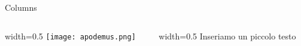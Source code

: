 \documentclass{beamer}
\begin{document}
\begin{frame}{Columns} 

    \begin{columns}
    \begin{column}{width=0.5\textwidth}
        \texttt{[image: apodemus.png]}       
    \end{column}
    \begin{column}{width=0.5\textwidth}
        Inseriamo un piccolo testo
    \end{column}
    \end{columns}
\end{frame}
\end{document}
